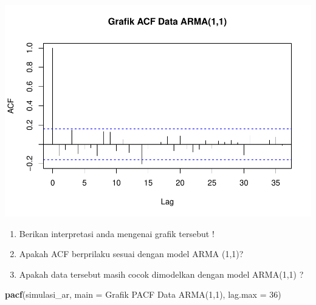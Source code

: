 \documentclass[
]{book}
\newenvironment{Shaded}{\begin{snugshade}}{\end{snugshade}}
\newcommand{\AttributeTok}[1]{\textcolor[rgb]{0.13,0.29,0.53}{#1}}
\newcommand{\DecValTok}[1]{\textcolor[rgb]{0.00,0.00,0.81}{#1}}
\newcommand{\FunctionTok}[1]{\textcolor[rgb]{0.13,0.29,0.53}{\textbf{#1}}}
\newcommand{\NormalTok}[1]{#1}
\newcommand{\StringTok}[1]{\textcolor[rgb]{0.31,0.60,0.02}{#1}}
\begin{document}
\begin{center}\includegraphics{_main_files/figure-latex/acf ARMA-1} \end{center}
\begin{jp}{}{}
\begin{enumerate}
\item Berikan interpretasi anda mengenai grafik tersebut !  
\item Apakah ACF berprilaku sesuai dengan model ARMA (1,1)?
\item Apakah data tersebut masih cocok dimodelkan dengan model ARMA(1,1) ?
\end{enumerate}
\end{jp}

\begin{Shaded}
\begin{Highlighting}[]
\FunctionTok{pacf}\NormalTok{(simulasi\_ar, }\AttributeTok{main =} \StringTok{\textquotesingle{}Grafik PACF Data ARMA(1,1)\textquotesingle{}}\NormalTok{, }
  \AttributeTok{lag.max =} \DecValTok{36}\NormalTok{)}
\end{Highlighting}
\end{Shaded}
\end{document}
